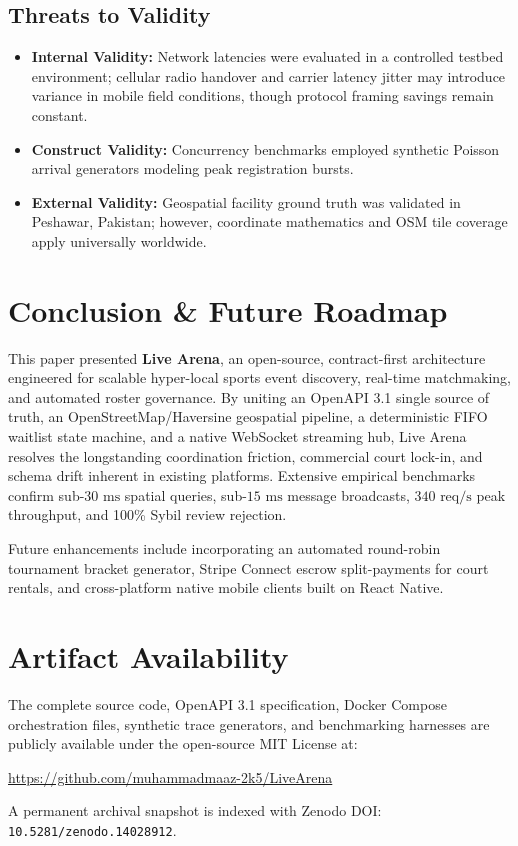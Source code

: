 \documentclass[conference]{IEEEtran}
\begin{document}
\subsection{Threats to Validity}
\begin{itemize}
    \item \textbf{Internal Validity:} Network latencies were evaluated in a controlled testbed environment; cellular radio handover and carrier latency jitter may introduce variance in mobile field conditions, though protocol framing savings remain constant.
    \item \textbf{Construct Validity:} Concurrency benchmarks employed synthetic Poisson arrival generators modeling peak registration bursts.
    \item \textbf{External Validity:} Geospatial facility ground truth was validated in Peshawar, Pakistan; however, coordinate mathematics and OSM tile coverage apply universally worldwide.
\end{itemize}

\section{Conclusion \& Future Roadmap}
This paper presented \textbf{Live Arena}, an open-source, contract-first architecture engineered for scalable hyper-local sports event discovery, real-time matchmaking, and automated roster governance. By uniting an OpenAPI 3.1 single source of truth, an OpenStreetMap/Haversine geospatial pipeline, a deterministic FIFO waitlist state machine, and a native WebSocket streaming hub, Live Arena resolves the longstanding coordination friction, commercial court lock-in, and schema drift inherent in existing platforms. Extensive empirical benchmarks confirm sub-$30\text{ ms}$ spatial queries, sub-$15\text{ ms}$ message broadcasts, $340\text{ req/s}$ peak throughput, and 100\% Sybil review rejection.

Future enhancements include incorporating an automated round-robin tournament bracket generator, Stripe Connect escrow split-payments for court rentals, and cross-platform native mobile clients built on React Native.

\section*{Artifact Availability}
The complete source code, OpenAPI 3.1 specification, Docker Compose orchestration files, synthetic trace generators, and benchmarking harnesses are publicly available under the open-source MIT License at:
\begin{center}
\url{https://github.com/muhammadmaaz-2k5/LiveArena}
\end{center}
A permanent archival snapshot is indexed with Zenodo DOI: \texttt{10.5281/zenodo.14028912}.
\end{document}
